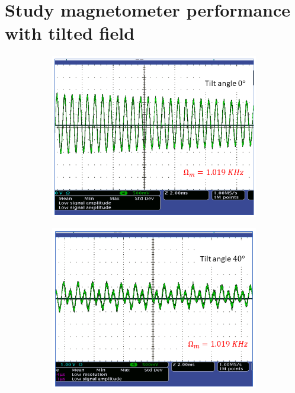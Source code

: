 \section{Study magnetometer performance with tilted field} 
\label{sec:tilted-results}
 \begin{figure}
    \centering
    \begin{subfigure}[b]{0.45\textwidth}
        \centering
        \includegraphics[width=\textwidth,trim={0cm 0.5cm 0cm 0cm},clip]{figures/tilt1.png}
        \caption{}
        \label{fig:tilt_0_degree}
    \end{subfigure}
    \hfill
    \begin{subfigure}[b]{0.45\textwidth}
        \centering
        \includegraphics[width=\textwidth,trim={0.7cm 0.5cm 0cm 0cm},clip]{figures/tilt2.png}

\end{subfigure}
\end{figure}
